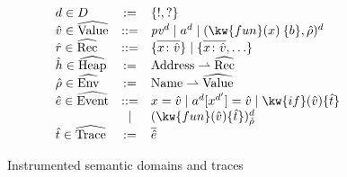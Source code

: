 \begin{figure}
\[\begin{array}{lcl}
d \in D & := & \{!,?\} \\
\hat{v} \in \widehat{\Value} & ::= & \mathit{pv}^d \mid a^d \mid (\kw{fun}(x)\>\{b\}, \hat{\rho})^d \\
\hat{r} \in \widehat{\Record} & ::= & \{\overline{x\colon \hat{v}}\} \mid \{\overline{x\colon \hat{v}}, \ldots\}\\
\hat{h} \in \widehat{\Heap} & := & \Address \rightharpoonup \widehat{\Record} \\
\hat{\rho} \in \widehat{\Env} & := & \Name \rightharpoonup \widehat{\Value} \\
\hat{e} \in \widehat{\Event} & ::= & x=\hat{v} \mid a^d[x^{d'}]=\hat{v} \mid \kw{if}(\hat{v})\{\hat{t}\} \\
                             & \mid & (\kw{fun}(\hat{v})\{\hat{t}\})_{\hat{\rho}}^d \\
\hat{t} \in \widehat{\Trace} & := & \overline{\hat{e}}
\end{array}\]
\caption{Instrumented semantic domains and traces}
\label{fig:instrumented-domains}
\end{figure}
